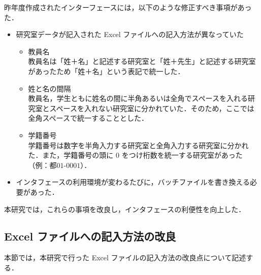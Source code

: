 \documentclass[a4paper,12pt,fleqn]{jarticle}
\begin{document}
昨年度作成されたインターフェースには，以下のような修正すべき事項があった．
\begin{itemize}
\item 研究室データが記入された Excel ファイルへの記入方法が異なっていた
  \begin{itemize}
  \item 教員名\\
    教員名は「姓＋名」と記述する研究室と「姓＋先生」と記述する研究室があったため「姓＋名」という表記で統一した．
  \item 姓と名の間隔\\
    教員名，学生ともに姓名の間に半角あるいは全角でスペースを入れる研究室とスペースを入れない研究室に分かれていた．そのため，ここでは全角スペースで統一することとした．
  \item 学籍番号\\
    学籍番号は数字を半角入力する研究室と全角入力する研究室に分かれた．また，学籍番号の頭に $0$ をつけ桁数を統一する研究室があった（例：都$01$-$0001$）．
  \end{itemize}
\item インタフェースの利用環境が変わるたびに，バッチファイルを書き換える必要があった．
\end{itemize}
本研究では，これらの事項を改良し，インタフェースの利便性を向上した．

\subsection{Excel ファイルへの記入方法の改良}
本節では，本研究で行った Excel ファイルの記入方法の改良点について記述する．
\end{document}
